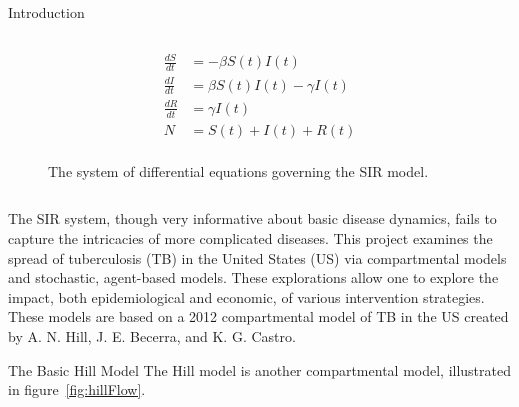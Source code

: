 \documentclass[final]{beamer}
\begin{document}
\begin{frame}
\begin{columns}
\begin{column}{.3\textwidth}
\begin{block}{Introduction}
\begin{block}{}
\begin{column}{.39\textwidth}
            \begin{figure}[h]
              \begin{align*}
                \frac{dS}{dt} &= -\beta S(t)I(t) \\
                \frac{dI}{dt} &= \beta S(t)I(t) - \gamma I(t) \\
                \frac{dR}{dt} &= \gamma I(t)\\
                N             &= S(t) + I(t) + R(t)\\
              \end{align*}
              \caption{The system of differential equations governing the SIR
                       model.}
              \label{eq:SIRdes}
            \end{figure}
          \end{column}
        \end{block}
        The SIR system, though very informative about basic disease dynamics,
        fails to capture the intricacies of more complicated diseases. This
        project examines the spread of tuberculosis (TB) in the United States
        (US) via compartmental models and stochastic, agent-based models. These
        explorations allow one to explore the impact, both epidemiological and
        economic, of various intervention strategies. These models are based on
        a 2012 compartmental model of TB in the US created by A. N. Hill, J. E.
        Becerra, and K. G. Castro.
      \end{block}
      \begin{block}{The Basic Hill Model}
        The Hill model is another compartmental model, illustrated in
        figure~\ref{fig:hillFlow}.
        \vspace{-2em}
        \begin{block}{}
          \begin{column}{.2\textwidth}
            \begin{figure}[h]
              \begin{center}

\end{center}
\end{figure}
\end{column}
\end{block}
\end{block}
\end{column}
\end{columns}
\end{frame}
\end{document}
